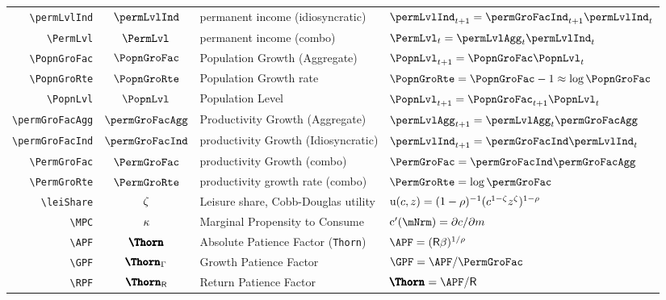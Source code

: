\documentclass[12pt]{\econtex}
\begin{document}
\begin{table}[ht]
\begin{tabular}{|>{\ttfamily}rcll|}
    \\ \verb|\permLvlInd|  & $\permLvlInd$ & permanent income (idiosyncratic) & $\permLvlInd_{t+1} = \permGroFacInd_{t+1}\permLvlInd_{t} $
    \\ \verb|\PermLvl|  & $\PermLvl$ & permanent income (combo) & $\PermLvl_{t} = \permLvlAgg_{t}\permLvlInd_{t} $
    \\ \verb|\PopnGroFac|   & $\PopnGroFac$ & Population Growth (Aggregate) & $\PopnLvl_{t+1} = \PopnGroFac \PopnLvl_{t}$
    \\ \verb|\PopnGroRte|   & $\PopnGroRte$ & Population Growth rate & $\PopnGroRte = \PopnGroFac - 1 \approx \log \PopnGroFac$
    \\ \verb|\PopnLvl|   & $\PopnLvl$ & Population Level & $\PopnLvl_{t+1} = \PopnGroFac_{t+1} \PopnLvl_{t}$
    \\ \verb|\permGroFacAgg|  & $\permGroFacAgg$ & Productivity Growth (Aggregate) & $\permLvlAgg_{t+1}=\permLvlAgg_{t} \permGroFacAgg$
    \\ \verb|\permGroFacInd|  & $\permGroFacInd$ & productivity Growth (Idiosyncratic) & $\permLvlInd_{t+1} = \permGroFacInd \permLvlInd_{t}$
    \\ \verb|\PermGroFac|  & $\PermGroFac$ & productivity Growth (combo) & $\PermGroFac = \permGroFacInd \permGroFacAgg$
    \\ \verb|\PermGroRte|  & $\PermGroRte$ & productivity growth rate (combo) & $\PermGroRte = \log \permGroFac$
    \\ \verb|\leiShare|  & $\zeta$ & Leisure share, Cobb-Douglas utility & ${\mathrm{u}}(c,z)=(1-\rho)^{-1}(c^{1-\zeta}z^{\zeta})^{1-\rho}$
    \\ \verb|\MPC|  & $\kappa$ & Marginal Propensity to Consume & $\cFunc^{\prime}(\mNrm)=\partial c/\partial m$
    \\ \verb|\APF|  & $\Pat$ & Absolute Patience Factor (\texttt{Thorn}) & $\APF = (\Rfree \DiscFac)^{1/\CRRA} $
    \\ \verb|\GPF| & $\PatPGro$ & Growth Patience Factor & $\GPF = \APF/\PermGroFac $
    \\ \verb|\RPF| & $\PatR$ & Return Patience Factor & $\Pat = \APF/\Rfree $ 

\end{tabular}
\end{table}
\end{document}
